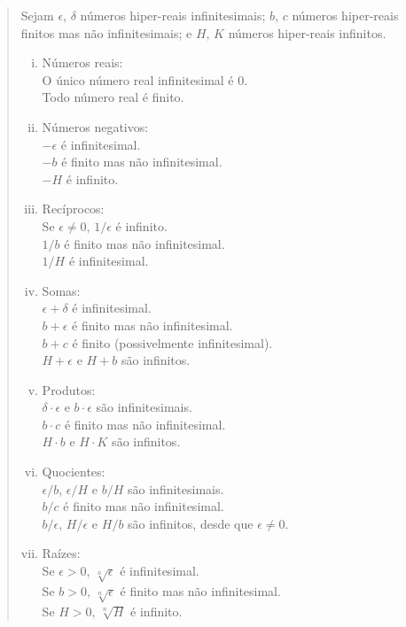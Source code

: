 \begin{quote}
Sejam $\epsilon$, $\delta$ números hiper-reais infinitesimais; $b$, $c$
números hiper-reais finitos mas não infinitesimais; e $H$, $K$ números
hiper-reais infinitos.

\begin{enumerate}[(i)]
\item Números reais:\\
      O único número real infinitesimal é $0$.\\
      Todo número real é finito.
\item Números negativos:\\
      $-\epsilon$ é infinitesimal.\\
      $-b$ é finito mas não infinitesimal.\\
      $-H$ é infinito.
\item Recíprocos:\\
      Se $\epsilon \ne 0$, $1/\epsilon$ é infinito.\\
      $1/b$ é finito mas não infinitesimal.\\
      $1/H$ é infinitesimal.
\item Somas:\\
      $\epsilon + \delta$ é infinitesimal.\\
      $b + \epsilon$ é finito mas não infinitesimal.\\
      $b + c$ é finito (possivelmente infinitesimal).\\
      $H + \epsilon$ e $H + b$ são infinitos.
\item Produtos:\\
      $\delta \cdot \epsilon$ e $b \cdot \epsilon$ são infinitesimais.\\
      $b \cdot c$ é finito mas não infinitesimal.\\
      $H \cdot b$ e $H \cdot K$ são infinitos.
\item Quocientes:\\
      $\epsilon/b$, $\epsilon/H$ e $b/H$ são infinitesimais.\\
      $b/c$ é finito mas não infinitesimal.\\
      $b/\epsilon$, $H/\epsilon$ e $H/b$ são infinitos, desde que $\epsilon \ne 0$.
\item Raízes:\\
      Se $\epsilon > 0$, $\sqrt[n]{\epsilon}$ é infinitesimal.\\
      Se $b > 0$, $\sqrt[n]{\epsilon}$ é finito mas não infinitesimal.\\
      Se $H > 0$, $\sqrt[n]{H}$ é infinito.
\end{enumerate}
\end{quote}


